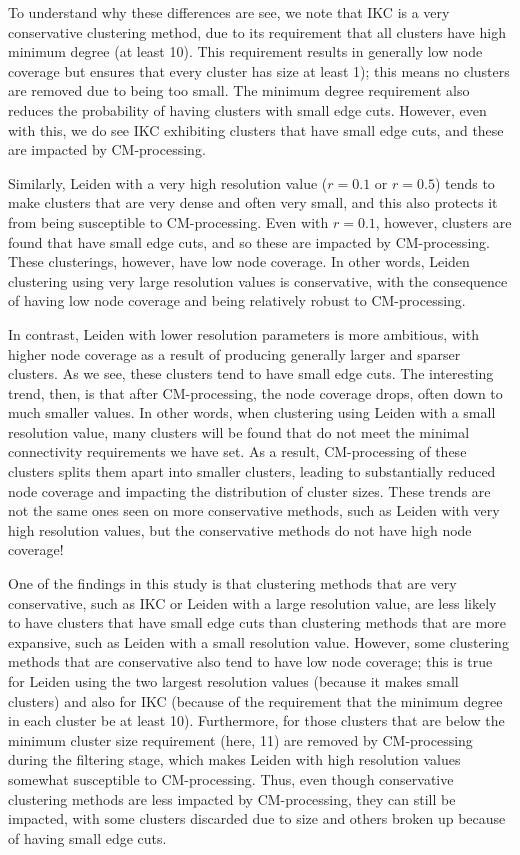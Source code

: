 \documentclass[11pt]{article}   	%
\begin{document}
To understand why these differences are see, we note that IKC is a very conservative clustering method, due to its requirement that all clusters have high minimum degree (at least 10). 
This requirement results in generally low node coverage but ensures that every cluster has size at least 1); this means no clusters are removed due to being too small. 
The minimum degree requirement also reduces the probability of having clusters with small edge cuts. However, even with this, we do see IKC exhibiting clusters that have
small edge cuts, and these are impacted by CM-processing.

Similarly, Leiden with a very high resolution value ($r=0.1$ or $r=0.5$) tends to make clusters that are very dense and often very small, and this also protects it from being susceptible to CM-processing.  Even with $r=0.1$, however, clusters are found that have small edge cuts, and so these are impacted by CM-processing.
These clusterings, however, have low node coverage. 
In other words, Leiden clustering using very large resolution values is conservative, with the consequence of having low node coverage and being relatively robust to CM-processing.

In contrast, Leiden with lower resolution parameters is more ambitious, with higher node coverage as a result of producing generally larger  and sparser clusters.
As we see, these clusters tend to have  small edge cuts.
The interesting trend, then, is that after CM-processing, the node coverage drops, often down to much smaller values.
In other words, when clustering using Leiden with a small resolution value, many clusters will be found that do not meet the minimal connectivity requirements we have set.
As a result, CM-processing of these clusters splits them apart into smaller clusters, leading to substantially reduced node coverage and impacting the distribution of cluster sizes.
These trends are not the same ones seen on more conservative methods, such as Leiden with very high resolution values, but the conservative methods do not have high node coverage!


One of the findings in this study is that clustering methods that are very conservative, such as  IKC or Leiden with a large resolution value, are less likely to have clusters that have small edge cuts than clustering methods that are more expansive, such as Leiden with a small resolution value. However, some clustering methods that are conservative also tend to have low node coverage; this is true for  Leiden using the two largest resolution values (because it makes small clusters) and also for IKC (because of the requirement that the minimum degree in each cluster be at least 10).  Furthermore, for those  clusters that are below the minimum cluster size requirement (here, 11) are removed by CM-processing during the filtering stage, which makes Leiden with high resolution values somewhat susceptible to CM-processing.  Thus, even though conservative clustering methods are less impacted by CM-processing, they can still be impacted, with some clusters discarded due to size and others broken up because of having small edge cuts.
\end{document}
